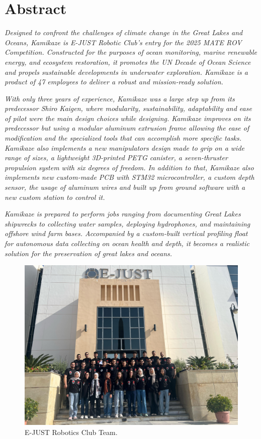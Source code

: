 \section{Abstract}
\small
\textit{Designed to confront the challenges of climate change in the Great Lakes and Oceans, Kamikaze is E-JUST Robotic Club’s entry for the 2025 MATE ROV Competition. Constructed for the purposes of ocean monitoring, marine renewable energy, and ecosystem restoration, it promotes the UN Decade of Ocean Science and propels sustainable developments in underwater exploration. Kamikaze is a product of 47 employees to deliver a robust and mission-ready solution.}

\textit{With only three years of experience, Kamikaze was a large step up from its predecessor Shiro Kaigen, where modularity, sustainability, adaptability and ease of pilot were the main design choices while designing. Kamikaze improves on its predecessor but using a modular aluminum extrusion frame allowing the ease of modification and the specialized tools that can accomplish more specific tasks. Kamikaze also implements a new manipulators design made to grip on a wide range of sizes, a lightweight 3D-printed PETG canister, a seven-thruster propulsion system with six degrees of freedom. In addition to that, Kamikaze also implements new custom-made PCB with STM32 microcontroller, a custom depth sensor, the usage of aluminum wires and built up from ground software with a new custom station to control it.}

\textit{Kamikaze is prepared to perform jobs ranging from documenting Great Lakes shipwrecks to collecting water samples, deploying hydrophones, and maintaining offshore wind farm bases. Accompanied by a custom-built vertical profiling float for autonomous data collecting on ocean health and depth, it becomes a realistic solution for the preservation of great lakes and oceans.}

\normalsize
\begin{figure}[hb!]
    \centering
    \includegraphics[width=\columnwidth]{Sections/1Abstract/team.jpeg}
    \caption{E-JUST Robotics Club Team.}
    \label{fig:team}
\end{figure}